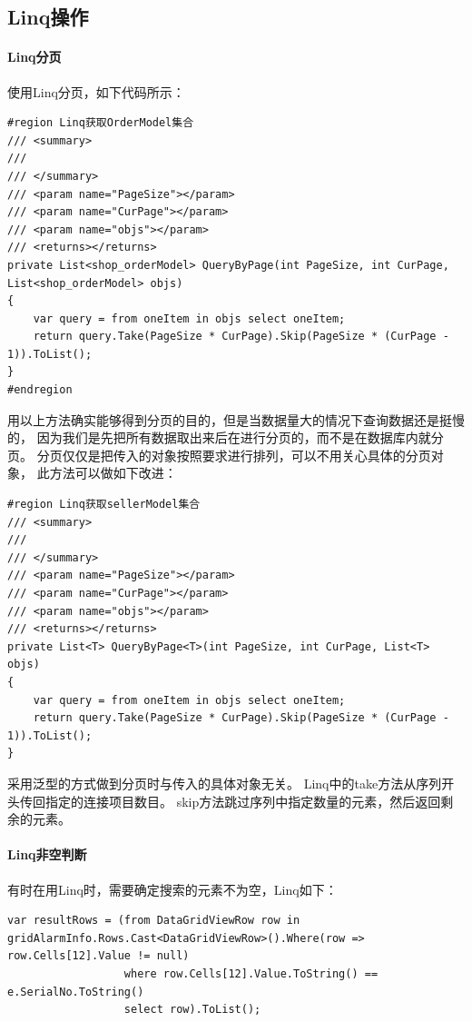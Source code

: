 \documentclass{book}
\begin{document}
\subsection{Linq操作}

\paragraph{Linq分页}

使用Linq分页，如下代码所示：

\begin{lstlisting}[language={[Sharp]C}]
#region Linq获取OrderModel集合
/// <summary>
/// 
/// </summary>
/// <param name="PageSize"></param>
/// <param name="CurPage"></param>
/// <param name="objs"></param>
/// <returns></returns>
private List<shop_orderModel> QueryByPage(int PageSize, int CurPage, List<shop_orderModel> objs)
{
    var query = from oneItem in objs select oneItem;
    return query.Take(PageSize * CurPage).Skip(PageSize * (CurPage - 1)).ToList();
}
#endregion
\end{lstlisting}

用以上方法确实能够得到分页的目的，但是当数据量大的情况下查询数据还是挺慢的，
因为我们是先把所有数据取出来后在进行分页的，而不是在数据库内就分页。
分页仅仅是把传入的对象按照要求进行排列，可以不用关心具体的分页对象，
此方法可以做如下改进：

\begin{lstlisting}[language={[Sharp]C}]
#region Linq获取sellerModel集合
/// <summary>
/// 
/// </summary>
/// <param name="PageSize"></param>
/// <param name="CurPage"></param>
/// <param name="objs"></param>
/// <returns></returns>
private List<T> QueryByPage<T>(int PageSize, int CurPage, List<T> objs)
{
    var query = from oneItem in objs select oneItem;
    return query.Take(PageSize * CurPage).Skip(PageSize * (CurPage - 1)).ToList();
}
\end{lstlisting}

采用泛型的方式做到分页时与传入的具体对象无关。
Linq中的take方法从序列开头传回指定的连接项目数目。
skip方法跳过序列中指定数量的元素，然后返回剩余的元素。

\paragraph{Linq非空判断}

有时在用Linq时，需要确定搜索的元素不为空，Linq如下：

\begin{lstlisting}[language={[Sharp]C}]
var resultRows = (from DataGridViewRow row in gridAlarmInfo.Rows.Cast<DataGridViewRow>().Where(row => row.Cells[12].Value != null)
				  where row.Cells[12].Value.ToString() == e.SerialNo.ToString()
				  select row).ToList();
\end{lstlisting}
\end{document}
